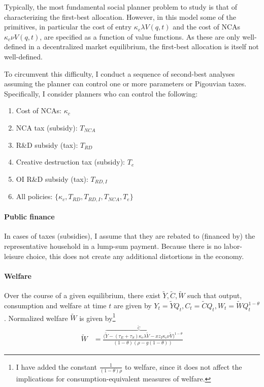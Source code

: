 \documentclass[11pt,english]{article}
\theoremstyle{remark}
\begin{document}
Typically, the most fundamental social planner problem to study is that of characterizing the first-best allocation. However, in this model some of the primitives, in particular the cost of entry $\kappa_e \lambda V(q,t)$ and the cost of NCAs $\kappa_c \nu V(q,t)$, are specified as a function of value functions. As these are only well-defined in a decentralized market equilibrium, the first-best allocation is itself not well-defined.

To circumvent this difficulty, I conduct a sequence of second-best analyses assuming the planner can control one or more parameters or Pigouvian taxes. Specifically, I consider planners who can control the following: 

\begin{enumerate}
	\item Cost of NCAs: $\kappa_c$ 
	\item NCA tax (subsidy): $T_{NCA}$
	\item R\&D subsidy (tax): $T_{RD}$
	\item Creative destruction tax (subsidy): $T_e$
	\item OI R\&D subsidy (tax): $T_{RD,I}$
	\item All policies: $\{\kappa_c, T_{RD}, T_{RD,I}, T_{NCA}, T_e\}$
\end{enumerate}

\paragraph{Public finance} 

In cases of taxes (subsidies), I assume that they are rebated to (financed by) the representative household in a lump-sum payment. Because there is no labor-leisure choice, this does not create any additional distortions in the economy. 

\paragraph{Welfare}

Over the course of a given equilibrium, there exist $\tilde{Y},\tilde{C},\tilde{W}$ such that output, consumption and welfare at time $t$ are given by $Y_t = \tilde{Y} Q_t, C_t = \tilde{C} Q_t, W_t = \tilde{W} Q_t^{1-\theta}$. Normalized welfare $\tilde{W}$ is given by\footnote{I have added the constant $\frac{1}{(1-\theta)\rho}$ to welfare, since it does not affect the implications for consumption-equivalent measures of welfare.}
\begin{align}
\tilde{W} &= \frac{\big(\overbrace{\tilde{Y} - (\tau_E + \tau_S) \kappa_{e} \lambda \tilde{V} - x z_I \kappa_c \nu \tilde{V}}^{\tilde{C}}\big)^{1-\theta}}{(1-\theta)(\rho - g(1-\theta))} \label{eq:agg_welfare}
\end{align}
\end{document}
